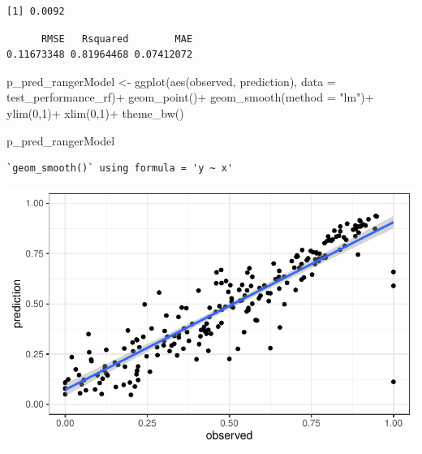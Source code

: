 \documentclass[
  letterpaper,
  DIV=11,
  numbers=noendperiod]{scrartcl}
\newenvironment{Shaded}{\begin{snugshade}}{\end{snugshade}}
\newcommand{\AttributeTok}[1]{\textcolor[rgb]{0.40,0.45,0.13}{#1}}
\newcommand{\CommentTok}[1]{\textcolor[rgb]{0.37,0.37,0.37}{#1}}
\newcommand{\DecValTok}[1]{\textcolor[rgb]{0.68,0.00,0.00}{#1}}
\newcommand{\FunctionTok}[1]{\textcolor[rgb]{0.28,0.35,0.67}{#1}}
\newcommand{\NormalTok}[1]{\textcolor[rgb]{0.00,0.23,0.31}{#1}}
\newcommand{\OtherTok}[1]{\textcolor[rgb]{0.00,0.23,0.31}{#1}}
\newcommand{\SpecialCharTok}[1]{\textcolor[rgb]{0.37,0.37,0.37}{#1}}
\newcommand{\StringTok}[1]{\textcolor[rgb]{0.13,0.47,0.30}{#1}}
\begin{document}
\begin{verbatim}
[1] 0.0092
\end{verbatim}

\begin{Shaded}
\end{Shaded}

\begin{verbatim}
      RMSE   Rsquared        MAE 
0.11673348 0.81964468 0.07412072 
\end{verbatim}

\begin{Shaded}
\begin{Highlighting}[]
\NormalTok{p\_pred\_rangerModel }\OtherTok{\textless{}{-}} \FunctionTok{ggplot}\NormalTok{(}\FunctionTok{aes}\NormalTok{(observed, prediction), }
                             \AttributeTok{data =}\NormalTok{ test\_performance\_rf)}\SpecialCharTok{+}
  \FunctionTok{geom\_point}\NormalTok{()}\SpecialCharTok{+}
  \FunctionTok{geom\_smooth}\NormalTok{(}\AttributeTok{method =} \StringTok{"lm"}\NormalTok{)}\SpecialCharTok{+}
  \FunctionTok{ylim}\NormalTok{(}\DecValTok{0}\NormalTok{,}\DecValTok{1}\NormalTok{)}\SpecialCharTok{+}
  \FunctionTok{xlim}\NormalTok{(}\DecValTok{0}\NormalTok{,}\DecValTok{1}\NormalTok{)}\SpecialCharTok{+}
  \FunctionTok{theme\_bw}\NormalTok{()}

\NormalTok{p\_pred\_rangerModel}
\end{Highlighting}
\end{Shaded}

\begin{verbatim}
`geom_smooth()` using formula = 'y ~ x'
\end{verbatim}

\includegraphics{MachineLearning_StaticPatterNN_Report_files/figure-pdf/final-models-ranger-1.pdf}
\end{document}
